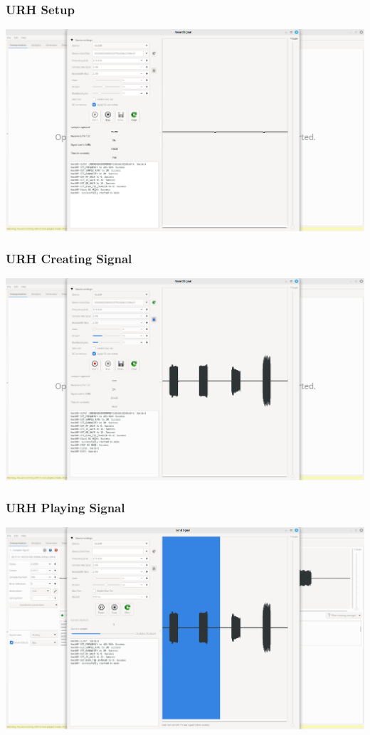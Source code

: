 \documentclass{beamer}
\begin{document}
\begin{frame}
\frametitle{URH Setup}
  \includegraphics[width=\textwidth]{../Pics/screenshots/URH-setup.png}
\end{frame}

\begin{frame}
\frametitle{URH Creating Signal}
  \includegraphics[width=\textwidth]{../Pics/screenshots/URH_Creating_Signal.png}
\end{frame}

\begin{frame}
\frametitle{URH Playing Signal}
  \includegraphics[width=\textwidth]{../Pics/screenshots/URH_Playing_Signal.png}
\end{frame}
\end{document}
